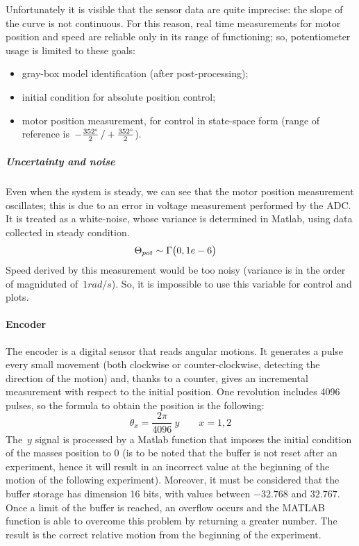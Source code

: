 Unfortunately it is visible that the sensor data are quite imprecise: the slope of the curve is not continuous. For this reason, real time measurements for motor position and speed are reliable only in its range of functioning; so, potentiometer usage is limited to these goals:

\begin{itemize}
	\item gray-box model identification (after post-processing);
	\item initial condition for absolute position control;
	\item motor position measurement, for control in state-space form (range of reference is~$-\frac{352 \degree}{2} \, / +\frac{352 \degree}{2}$).
\end{itemize}

\subparagraph{Uncertainty and noise}
Even when the system is steady, we can see that the motor position measurement oscillates; this is due to an error in voltage measurement performed by the ADC. It is treated as a white-noise, whose variance is determined in Matlab, using data collected in steady condition.
\begin{align*}
	\Theta_{pot} &\sim \Gamma \bigl{(} 0, 1e-6 \bigr{)}
\end{align*}
Speed derived by this measurement would be too noisy (variance is in the order of magniduted of~$1 rad/s$). So, it is impossible to use this variable for control and plots.

\paragraph{Encoder}

The encoder is a digital sensor that reads angular motions. It generates a pulse every small movement (both clockwise or counter-clockwise, detecting the direction of the motion) and, thanks to a counter, gives an incremental measurement with respect to the initial position. One revolution includes 4096 pulses, so the formula to obtain the position is the following:
\[
	\theta_x = \frac{2\pi}{4096} \ y \qquad x={1,2}
\]
The~$y$ signal is processed by a Matlab function that imposes the initial condition of the masses position to 0 (is to be noted that the buffer is not reset after an experiment, hence it will result in an incorrect value at the beginning of the motion of the following experiment). Moreover, it must be considered that the buffer storage has dimension 16 bits, with values between $-32.768$ and $32.767$. Once a limit of the buffer is reached, an overflow occurs and the MATLAB function is able to overcome this problem by returning a greater number. The result is the correct relative motion from the beginning of the experiment.

